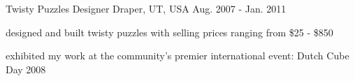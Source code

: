 \begin{cventries}
    
    
  \cventry
    {Twisty Puzzles} %
    {Designer} %
    {Draper, UT, USA} %
    {Aug. 2007 - Jan. 2011} %
    {
      \begin{cvitems} %
        \item {designed and built twisty puzzles with selling prices ranging from \$25 - \$850}
        \item {exhibited my work at the community’s premier international event: Dutch Cube Day 2008}
      \end{cvitems}
    }
\end{cventries}

